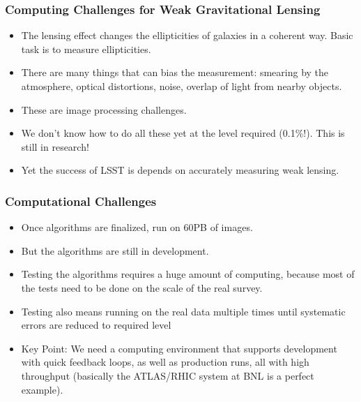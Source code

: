 \documentclass{beamer}
\begin{document}
\frame
{
    \frametitle{Computing Challenges for Weak Gravitational Lensing}

 
    \begin{itemize}


        \item The lensing effect changes the ellipticities of galaxies in a coherent way.
            Basic task is to measure ellipticities.

        \item There are many things that can bias the measurement: smearing by the atmosphere,
            optical distortions, noise, overlap of light from nearby objects.

        \item These are image processing challenges.
            
        \item We don't know how to do all these yet at the level required
            (0.1\%!).  This is still in {\color{gold} research!}

        \item Yet the success of LSST is depends on accurately measuring weak lensing.

    \end{itemize}

}

\frame
{
    \frametitle{Computational Challenges}

 
    \begin{itemize}

        \item Once algorithms are finalized, run on 60PB of images.

        \item But the algorithms are still in development.

        \item Testing the algorithms requires a huge amount of computing, because 
            most of the tests need to be done on the scale of the real survey.

        \item Testing also means running on the real data multiple times until
            systematic errors are reduced to required level

        \item Key Point:  We need a computing environment that supports
            development with quick feedback loops, as well as production runs,
            all with high throughput (basically the ATLAS/RHIC system at BNL
            is a perfect example).

    \end{itemize}

}
\end{document}
